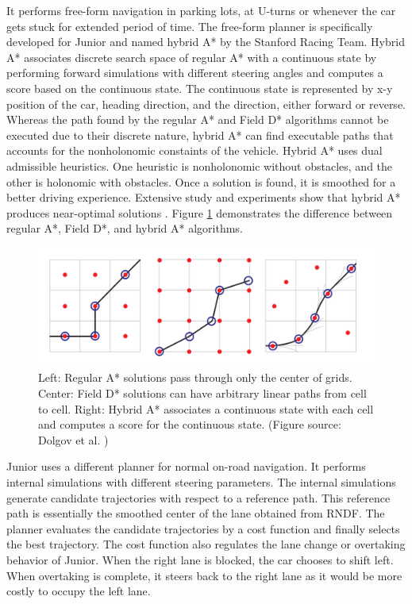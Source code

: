 It performs free-form navigation in parking lots, at U-turns or whenever the
car gets stuck for extended period of time. The free-form planner is
specifically developed for Junior and named hybrid A* by the Stanford Racing
Team. Hybrid A* associates discrete search space of regular A* with a
continuous state by performing forward simulations with different steering
angles and computes a score based on the continuous state. The continuous state
is represented by x-y position of the car, heading direction, and the
direction, either forward or reverse. Whereas the path found by the regular A*
and Field D* algorithms cannot be executed due to their discrete nature, hybrid
A* can find executable paths that accounts for the nonholonomic constaints of
the vehicle. Hybrid A* uses dual admissible heuristics. One heuristic is
nonholonomic without obstacles, and the other is holonomic with obstacles. Once
a solution is found, it is smoothed for a better driving experience. Extensive
study and experiments show that hybrid A* produces near-optimal solutions
\cite{Dolgov2010PathPF, Petereit2012Application}. Figure
\ref{figure:hybridastar-comparison} demonstrates the difference between regular
A*, Field D*, and hybrid A* algorithms.

\begin{figure}[h]
  \centering
  \includegraphics[width=.8\textwidth]{figures/hybridastar-comparison.png}
  \caption[A*, Field D* and Hybrid A* algorithms]{Left: Regular A* solutions
    pass through only the center of grids. Center: Field D* solutions can
    have arbitrary linear paths from cell to cell. Right: Hybrid A* associates
    a continuous state with each cell and computes a score for the continuous
  state. (Figure source: Dolgov et al. \cite{Dolgov2010PathPF})}
  \label{figure:hybridastar-comparison}
\end{figure}

Junior uses a different planner for normal on-road navigation. It performs
internal simulations with different steering parameters. The internal
simulations generate candidate trajectories with respect to a reference path.
This reference path is essentially the smoothed center of the lane obtained
from RNDF. The planner evaluates the candidate trajectories by a cost function
and finally selects the best trajectory. The cost function also regulates the
lane change or overtaking behavior of Junior. When the right lane is blocked,
the car chooses to shift left. When overtaking is complete, it steers back
to the right lane as it would be more costly to occupy the left lane.

